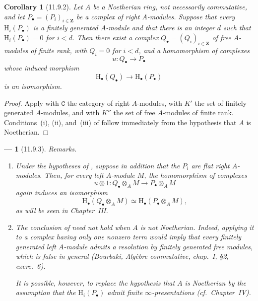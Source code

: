 \documentclass[oneside]{amsart}
\theoremstyle{ega-env-style}
\newtheorem*{env}{---}
\theoremstyle{ega-thm-env-style}
\newtheorem*{corollary}{Corollary}
\theoremstyle{ega-defn-env-style}
\def\bb{\mathbf}                    %
\def\cat{\mathtt}                   %
\def\HH{\mathrm{H}}                 %
\def\isoto{\simeq} %
\let\EGAOriginalLabel\label
\renewcommand{\label}[1]{\phantomsection\EGAOriginalLabel{#1}}
\begin{document}
\begin{corollary}[11.9.2]
\label{0.11.9.2}
Let $A$ be a Noetherian ring, not necessarily commutative, and let
$P_\bullet=(P_i)_{i\in\bb{Z}}$ be a complex of right $A$-modules.
Suppose that every $\HH_i(P_\bullet)$ is a finitely generated
$A$-module and that there is an integer $d$ such that
$\HH_i(P_\bullet)=0$ for $i<d$.
Then there exist a complex $Q_\bullet=(Q_i)_{i\in\bb{Z}}$ of free
$A$-modules of finite rank, with $Q_i=0$ for $i<d$, and a homomorphism
of complexes
\[
  u:Q_\bullet\longrightarrow P_\bullet
\]
whose induced morphism
\[
  \HH_\bullet(Q_\bullet)\longrightarrow\HH_\bullet(P_\bullet)
\]
is an isomorphism.
\end{corollary}

\begin{proof}
Apply  with $\cat{C}$ the category of right
$A$-modules, with $K'$ the set of finitely generated $A$-modules, and
with $K''$ the set of free $A$-modules of finite rank.
Conditions~(i), (ii), and~(iii) of  follow immediately
from the hypothesis that $A$ is Noetherian.
\end{proof}

\begin{env}[11.9.3]
\label{0.11.9.3}
\emph{Remarks}.
\begin{enumerate}
  \item[{\rm(i)}]
  Under the hypotheses of , suppose in addition that the
  $P_i$ are flat right $A$-modules.
  Then, for every left $A$-module $M$, the homomorphism of complexes
  \[
    u\otimes 1:
    Q_\bullet\otimes_A M
    \longrightarrow
    P_\bullet\otimes_A M
  \]
  again induces an isomorphism
  \[
    \HH_\bullet(Q_\bullet\otimes_A M)
    \isoto
    \HH_\bullet(P_\bullet\otimes_A M),
  \]
  as will be seen in Chapter~III.

  \item[{\rm(ii)}]
  The conclusion of  need not hold when $A$ is not
  Noetherian.
  Indeed, applying it to a complex having only one nonzero term would
  imply that every finitely generated left $A$-module admits a resolution by
  finitely generated free modules, which is false in general
  (Bourbaki, \emph{Alg\`ebre commutative}, chap.~I, \S2, exerc.~6).

  It is possible, however, to replace the hypothesis that $A$ is
  Noetherian by the assumption that the $\HH_i(P_\bullet)$ admit finite
  $\infty$-presentations (cf.\ Chapter~IV).
\end{enumerate}
\end{env}
\end{document}
